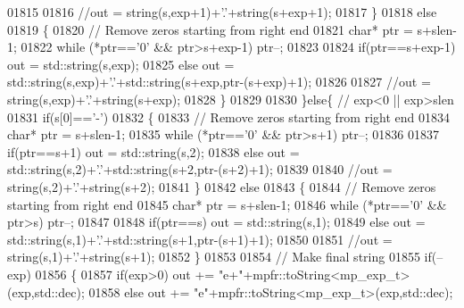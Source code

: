 \begin{DoxyCode}
{01815 
01816                 \textcolor{comment}{//out = string(s,exp+1)+'.'+string(s+exp+1);}
01817             \}
01818             \textcolor{keywordflow}{else}
01819             \{
01820                 \textcolor{comment}{// Remove zeros starting from right end}
01821                 \textcolor{keywordtype}{char}* ptr = s+slen-1;
01822                 \textcolor{keywordflow}{while} (*ptr==\textcolor{charliteral}{'0'} && ptr>s+exp-1) ptr--;
01823 
01824                 \textcolor{keywordflow}{if}(ptr==s+exp-1) out = std::string(s,exp);
01825                 \textcolor{keywordflow}{else}             out = std::string(s,exp)+\textcolor{charliteral}{'.'}+std::string(s+exp,ptr-(s+exp)+1);
01826 
01827                 \textcolor{comment}{//out = string(s,exp)+'.'+string(s+exp);}
01828             \}
01829 
01830         \}\textcolor{keywordflow}{else}\{ \textcolor{comment}{// exp<0 || exp>slen}
01831             \textcolor{keywordflow}{if}(s[0]==\textcolor{charliteral}{'-'})
01832             \{
01833                 \textcolor{comment}{// Remove zeros starting from right end}
01834                 \textcolor{keywordtype}{char}* ptr = s+slen-1;
01835                 \textcolor{keywordflow}{while} (*ptr==\textcolor{charliteral}{'0'} && ptr>s+1) ptr--;
01836 
01837                 \textcolor{keywordflow}{if}(ptr==s+1) out = std::string(s,2);
01838                 \textcolor{keywordflow}{else}         out = std::string(s,2)+\textcolor{charliteral}{'.'}+std::string(s+2,ptr-(s+2)+1);
01839 
01840                 \textcolor{comment}{//out = string(s,2)+'.'+string(s+2);}
01841             \}
01842             \textcolor{keywordflow}{else}
01843             \{
01844                 \textcolor{comment}{// Remove zeros starting from right end}
01845                 \textcolor{keywordtype}{char}* ptr = s+slen-1;
01846                 \textcolor{keywordflow}{while} (*ptr==\textcolor{charliteral}{'0'} && ptr>s) ptr--;
01847 
01848                 \textcolor{keywordflow}{if}(ptr==s) out = std::string(s,1);
01849                 \textcolor{keywordflow}{else}       out = std::string(s,1)+\textcolor{charliteral}{'.'}+std::string(s+1,ptr-(s+1)+1);
01850 
01851                 \textcolor{comment}{//out = string(s,1)+'.'+string(s+1);}
01852             \}
01853 
01854             \textcolor{comment}{// Make final string}
01855             \textcolor{keywordflow}{if}(--exp)
01856             \{
01857                 \textcolor{keywordflow}{if}(exp>0) out += \textcolor{stringliteral}{"e+"}+mpfr::toString<mp\_exp\_t>(exp,std::dec);
01858                 \textcolor{keywordflow}{else}       out += \textcolor{stringliteral}{"e"}+mpfr::toString<mp\_exp\_t>(exp,std::dec);
}
\end{DoxyCode}
